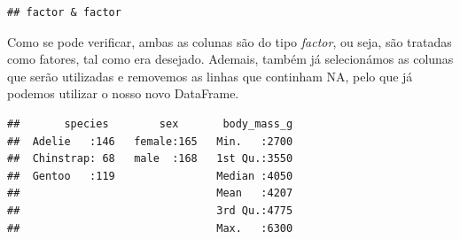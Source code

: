 \documentclass[]{article}
\begin{document}
\begin{Shaded}
\begin{Highlighting}[]
\OtherTok{\textless{}{-}}\NormalTok{ penguins[, }\NormalTok{(}\NormalTok{, }\NormalTok{, }\NormalTok{)]}

\OtherTok{\textless{}{-}} 

\NormalTok{(}\SpecialCharTok{$}\NormalTok{, }\SpecialCharTok{$}
\end{Highlighting}
\end{Shaded}

\begin{verbatim}
## factor & factor
\end{verbatim}

Como se pode verificar, ambas as colunas são do tipo \emph{factor}, ou
seja, são tratadas como fatores, tal como era desejado. Ademais, também
já selecionámos as colunas que serão utilizadas e removemos as linhas
que continham NA, pelo que já podemos utilizar o nosso novo DataFrame.

\begin{Shaded}
\begin{Highlighting}[]
\end{Highlighting}
\end{Shaded}

\begin{verbatim}
##       species        sex       body_mass_g  
##  Adelie   :146   female:165   Min.   :2700  
##  Chinstrap: 68   male  :168   1st Qu.:3550  
##  Gentoo   :119                Median :4050  
##                               Mean   :4207  
##                               3rd Qu.:4775  
##                               Max.   :6300
\end{verbatim}

\begin{Shaded}
\begin{Highlighting}[]
\end{Highlighting}
\end{Shaded}
\end{document}
